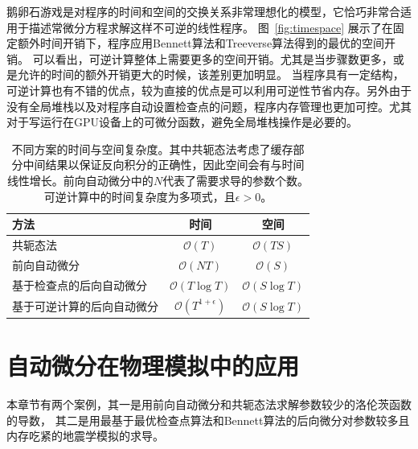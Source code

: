 \documentclass[A4,twoside,fontset=ubuntu,UTF8]{ctexart}
\newcommand{\bigO}{{\mathcal{O}}}
\begin{document}

鹅卵石游戏是对程序的时间和空间的交换关系非常理想化的模型，它恰巧非常合适用于描述常微分方程求解这样不可逆的线性程序。
图~\ref{fig:timespace} 展示了在固定额外时间开销下，程序应用Bennett算法和Treeverse算法得到的最优的空间开销。
可以看出，可逆计算整体上需要更多的空间开销。尤其是当步骤数更多，或是允许的时间的额外开销更大的时候，该差别更加明显。
当程序具有一定结构，可逆计算也有不错的优点，较为直接的优点是可以利用可逆性节省内存。另外由于没有全局堆栈以及对程序自动设置检查点的问题，程序内存管理也更加可控。尤其对于写运行在GPU设备上的可微分函数，避免全局堆栈操作是必要的。

\begin{table}\centering
    \begin{tabularx}{0.7\textwidth}{Xcc}\toprule
        \textbf{方法} & 时间 & 空间\\
        \hline
        共轭态法                     &  $\bigO(T)$          & $\bigO(TS)$\\
        前向自动微分                 &  $\bigO(NT)$         & $\bigO(S)$  \\
        基于检查点的后向自动微分     &  $\bigO(T\log T)$    & $\bigO(S\log T)$   \\
        基于可逆计算的后向自动微分   &  $\bigO(T^{1+\epsilon})$ & $\bigO(S\log T)$ \\
        \bottomrule
    \end{tabularx}
    \caption{不同方案的时间与空间复杂度。其中共轭态法考虑了缓存部分中间结果以保证反向积分的正确性，因此空间会有与时间线性增长。前向自动微分中的$N$代表了需要求导的参数个数。可逆计算中的时间复杂度为多项式，且$\epsilon > 0$。}\label{tbl:complexity}
\end{table}

\section{自动微分在物理模拟中的应用}\label{sec:applications}
本章节有两个案例，其一是用前向自动微分和共轭态法求解参数较少的洛伦茨函数的导数，
其二是用最基于最优检查点算法和Bennett算法的后向微分对参数较多且内存吃紧的地震学模拟的求导。
\end{document}
